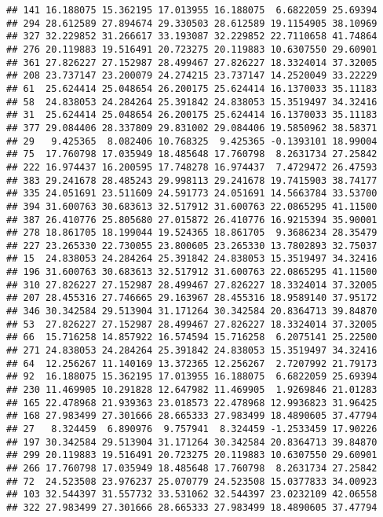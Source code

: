 \documentclass[
]{article}
\begin{document}
\begin{verbatim}
## 141 16.188075 15.362195 17.013955 16.188075  6.6822059 25.69394
## 294 28.612589 27.894674 29.330503 28.612589 19.1154905 38.10969
## 327 32.229852 31.266617 33.193087 32.229852 22.7110658 41.74864
## 276 20.119883 19.516491 20.723275 20.119883 10.6307550 29.60901
## 361 27.826227 27.152987 28.499467 27.826227 18.3324014 37.32005
## 208 23.737147 23.200079 24.274215 23.737147 14.2520049 33.22229
## 61  25.624414 25.048654 26.200175 25.624414 16.1370033 35.11183
## 58  24.838053 24.284264 25.391842 24.838053 15.3519497 34.32416
## 31  25.624414 25.048654 26.200175 25.624414 16.1370033 35.11183
## 377 29.084406 28.337809 29.831002 29.084406 19.5850962 38.58371
## 29   9.425365  8.082406 10.768325  9.425365 -0.1393101 18.99004
## 75  17.760798 17.035949 18.485648 17.760798  8.2631734 27.25842
## 222 16.974437 16.200595 17.748278 16.974437  7.4729472 26.47593
## 383 29.241678 28.485243 29.998113 29.241678 19.7415903 38.74177
## 335 24.051691 23.511609 24.591773 24.051691 14.5663784 33.53700
## 394 31.600763 30.683613 32.517912 31.600763 22.0865295 41.11500
## 387 26.410776 25.805680 27.015872 26.410776 16.9215394 35.90001
## 278 18.861705 18.199044 19.524365 18.861705  9.3686234 28.35479
## 227 23.265330 22.730055 23.800605 23.265330 13.7802893 32.75037
## 15  24.838053 24.284264 25.391842 24.838053 15.3519497 34.32416
## 196 31.600763 30.683613 32.517912 31.600763 22.0865295 41.11500
## 310 27.826227 27.152987 28.499467 27.826227 18.3324014 37.32005
## 207 28.455316 27.746665 29.163967 28.455316 18.9589140 37.95172
## 346 30.342584 29.513904 31.171264 30.342584 20.8364713 39.84870
## 53  27.826227 27.152987 28.499467 27.826227 18.3324014 37.32005
## 66  15.716258 14.857922 16.574594 15.716258  6.2075141 25.22500
## 271 24.838053 24.284264 25.391842 24.838053 15.3519497 34.32416
## 64  12.256267 11.140169 13.372365 12.256267  2.7207992 21.79173
## 92  16.188075 15.362195 17.013955 16.188075  6.6822059 25.69394
## 230 11.469905 10.291828 12.647982 11.469905  1.9269846 21.01283
## 165 22.478968 21.939363 23.018573 22.478968 12.9936823 31.96425
## 168 27.983499 27.301666 28.665333 27.983499 18.4890605 37.47794
## 27   8.324459  6.890976  9.757941  8.324459 -1.2533459 17.90226
## 197 30.342584 29.513904 31.171264 30.342584 20.8364713 39.84870
## 299 20.119883 19.516491 20.723275 20.119883 10.6307550 29.60901
## 266 17.760798 17.035949 18.485648 17.760798  8.2631734 27.25842
## 72  24.523508 23.976237 25.070779 24.523508 15.0377833 34.00923
## 103 32.544397 31.557732 33.531062 32.544397 23.0232109 42.06558
## 322 27.983499 27.301666 28.665333 27.983499 18.4890605 37.47794

\end{verbatim}
\end{document}
